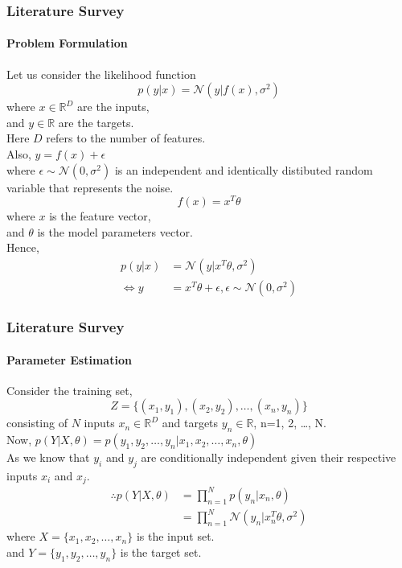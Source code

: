 \documentclass[handout,9pt]{beamer}
\numberwithin{theorem}{section}
\begin{document}
\begin{frame}
	\begin{spacing}{1}
		\frametitle{Literature Survey}
		\framesubtitle{Problem Formulation}
		Let us consider the likelihood function
		\begin{equation*}
			p(y|x)= \mathcal{N}(y|f(x),\sigma^2)
		\end{equation*}
		where $x \in \mathbb{R}^D$ are the inputs,\\
		and $y \in \mathbb{R}$ are the targets.\\
		Here $D$ refers to the number of features.\\ 
		Also, $y= f(x) + \epsilon$ \\
		where $\epsilon \sim \mathcal{N}(0,\sigma^2)$ is an independent and identically distibuted random variable that represents the noise.\\\vspace{0.2cm}\pause
		\begin{equation*}
			f(x)=x^T\theta
		\end{equation*}
		where $x$ is the feature vector,\\
		and $\theta$ is the model parameters vector.\\ \vspace{0.2cm} \pause
		Hence,
		\begin{align*}
			p(y|x)&= \mathcal{N}(y|x^T\theta,\sigma^2)\\
			\Leftrightarrow y &= x^T\theta + \epsilon, \epsilon \sim \mathcal{N}(0,\sigma^2)
		\end{align*} 	
	\end{spacing}
\end{frame}

\begin{frame}
	\begin{spacing}{1}
		\frametitle{Literature Survey}
		\framesubtitle{Parameter Estimation}
		Consider the training set,
		\begin{equation*}
			Z=\{(x_{1},y_{1}), (x_{2},y_{2}), \dots, (x_{n},y_{n})\}
		\end{equation*}
		consisting of $N$ inputs $x_{n} \in \mathbb{R}^D$ and targets $y_{n} \in \mathbb{R}$, n=1, 2, \dots, N.\\ \pause \vspace{0.2cm}
		Now, $p(Y|X,\theta) = p(y_{1}, y_{2},\dots, y_{n}|x_{1}, x_{2}, \dots, x_{n}, \theta)$\\
		As we know that $y_{i}$ and $y_{j}$ are conditionally independent given their respective inputs $x_{i}$ and $x_{j}$.\\
		\begin{align*}
			\therefore p(Y|X,\theta)&=\prod_{n=1}^{N} p(y_{n}|x_{n}, \theta)\\
			&=\prod_{n=1}^{N} \mathcal{N}(y_n|x_n^T\theta,\sigma^2)
		\end{align*}
		where $X = \{x_{1}, x_{2}, \dots, x_{n}\}$ is the input set.\\
		and $Y = \{y_{1}, y_{2}, \dots, y_{n}\}$ is the target set.\\ 
	\end{spacing}
\end{frame}
\end{document}
